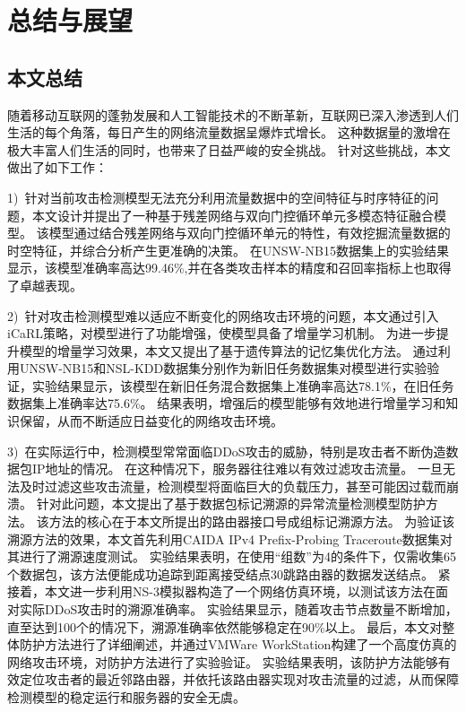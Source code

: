 \chapter{总结与展望}
\label{cha:over_view}

\section{本文总结}


随着移动互联网的蓬勃发展和人工智能技术的不断革新，互联网已深入渗透到人们生活的每个角落，每日产生的网络流量数据呈爆炸式增长。
这种数据量的激增在极大丰富人们生活的同时，也带来了日益严峻的安全挑战。
针对这些挑战，本文做出了如下工作：\par
1)~针对当前攻击检测模型无法充分利用流量数据中的空间特征与时序特征的问题，本文设计并提出了一种基于残差网络与双向门控循环单元多模态特征融合模型。
该模型通过结合残差网络与双向门控循环单元的特性，有效挖掘流量数据的时空特征，并综合分析产生更准确的决策。
在UNSW-NB15数据集上的实验结果显示，该模型准确率高达99.46\%,并在各类攻击样本的精度和召回率指标上也取得了卓越表现。\par

2)~针对攻击检测模型难以适应不断变化的网络攻击环境的问题，本文通过引入iCaRL策略，对模型进行了功能增强，使模型具备了增量学习机制。
为进一步提升模型的增量学习效果，本文又提出了基于遗传算法的记忆集优化方法。
通过利用UNSW-NB15和NSL-KDD数据集分别作为新旧任务数据集对模型进行实验验证，实验结果显示，该模型在新旧任务混合数据集上准确率高达78.1\%，在旧任务数据集上准确率达75.6\%。
结果表明，增强后的模型能够有效地进行增量学习和知识保留，从而不断适应日益变化的网络攻击环境。\par


3)~在实际运行中，检测模型常常面临DDoS攻击的威胁，特别是攻击者不断伪造数据包IP地址的情况。
在这种情况下，服务器往往难以有效过滤攻击流量。
一旦无法及时过滤这些攻击流量，检测模型将面临巨大的负载压力，甚至可能因过载而崩溃。
针对此问题，本文提出了基于数据包标记溯源的异常流量检测模型防护方法。
该方法的核心在于本文所提出的路由器接口号成组标记溯源方法。
为验证该溯源方法的效果，本文首先利用CAIDA IPv4 Prefix-Probing Traceroute数据集对其进行了溯源速度测试。
实验结果表明，在使用“组数”为4的条件下，仅需收集65个数据包，该方法便能成功追踪到距离接受结点30跳路由器的数据发送结点。
紧接着，本文进一步利用NS-3模拟器构造了一个网络仿真环境，以测试该方法在面对实际DDoS攻击时的溯源准确率。
实验结果显示，随着攻击节点数量不断增加，直至达到100个的情况下，溯源准确率依然能够稳定在90\%以上。
最后，本文对整体防护方法进行了详细阐述，并通过VMWare WorkStation构建了一个高度仿真的网络攻击环境，对防护方法进行了实验验证。
实验结果表明，该防护方法能够有效定位攻击者的最近邻路由器，并依托该路由器实现对攻击流量的过滤，从而保障检测模型的稳定运行和服务器的安全无虞。

